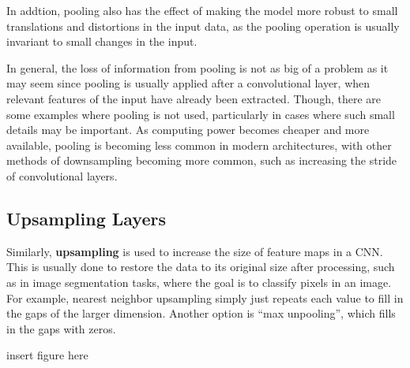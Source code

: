 \documentclass[12pt]{report}
\theoremstyle{definition}
\theoremstyle{remark}
\begin{document}
In addtion, pooling also has the effect of making the model more robust to small translations and distortions in the input data, as the pooling operation is usually invariant to small changes in the input.

In general, the loss of information from pooling is not as big of a problem as it may seem since pooling is usually applied after a convolutional layer, when relevant features of the input have already been extracted. Though, there are some examples where pooling is not used, particularly in cases where such small details may be important. As computing power becomes cheaper and more available, pooling is becoming less common in modern architectures, with other methods of downsampling becoming more common, such as increasing the stride of convolutional layers.

\subsection{Upsampling Layers}
Similarly, \textbf{upsampling} is used to increase the size of feature maps in a CNN\@. This is usually done to restore the data to its original size after processing, such as in image segmentation tasks, where the goal is to classify pixels in an image.
For example, nearest neighbor upsampling simply just repeats each value to fill in the gaps of the larger dimension. Another option is ``max unpooling'', which fills in the gaps with zeros.

insert figure here
\end{document}
